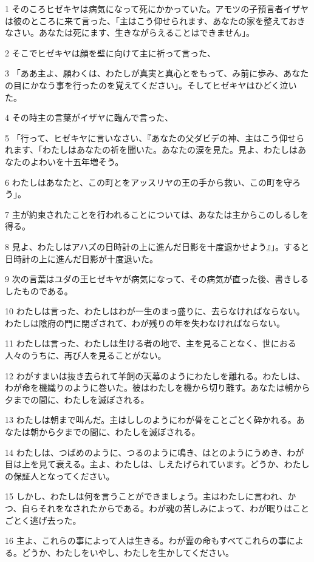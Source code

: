\par 1 そのころヒゼキヤは病気になって死にかかっていた。アモツの子預言者イザヤは彼のところに来て言った、「主はこう仰せられます、あなたの家を整えておきなさい。あなたは死にます、生きながらえることはできません」。
\par 2 そこでヒゼキヤは顔を壁に向けて主に祈って言った、
\par 3 「ああ主よ、願わくは、わたしが真実と真心とをもって、み前に歩み、あなたの目にかなう事を行ったのを覚えてください」。そしてヒゼキヤはひどく泣いた。
\par 4 その時主の言葉がイザヤに臨んで言った、
\par 5 「行って、ヒゼキヤに言いなさい、『あなたの父ダビデの神、主はこう仰せられます、「わたしはあなたの祈を聞いた。あなたの涙を見た。見よ、わたしはあなたのよわいを十五年増そう。
\par 6 わたしはあなたと、この町とをアッスリヤの王の手から救い、この町を守ろう」。
\par 7 主が約束されたことを行われることについては、あなたは主からこのしるしを得る。
\par 8 見よ、わたしはアハズの日時計の上に進んだ日影を十度退かせよう』」。すると日時計の上に進んだ日影が十度退いた。
\par 9 次の言葉はユダの王ヒゼキヤが病気になって、その病気が直った後、書きしるしたものである。
\par 10 わたしは言った、わたしはわが一生のまっ盛りに、去らなければならない。わたしは陰府の門に閉ざされて、わが残りの年を失わなければならない。
\par 11 わたしは言った、わたしは生ける者の地で、主を見ることなく、世におる人々のうちに、再び人を見ることがない。
\par 12 わがすまいは抜き去られて羊飼の天幕のようにわたしを離れる。わたしは、わが命を機織りのように巻いた。彼はわたしを機から切り離す。あなたは朝から夕までの間に、わたしを滅ぼされる。
\par 13 わたしは朝まで叫んだ。主はししのようにわが骨をことごとく砕かれる。あなたは朝から夕までの間に、わたしを滅ぼされる。
\par 14 わたしは、つばめのように、つるのように鳴き、はとのようにうめき、わが目は上を見て衰える。主よ、わたしは、しえたげられています。どうか、わたしの保証人となってください。
\par 15 しかし、わたしは何を言うことができましょう。主はわたしに言われ、かつ、自らそれをなされたからである。わが魂の苦しみによって、わが眠りはことごとく逃げ去った。
\par 16 主よ、これらの事によって人は生きる。わが霊の命もすべてこれらの事による。どうか、わたしをいやし、わたしを生かしてください。
